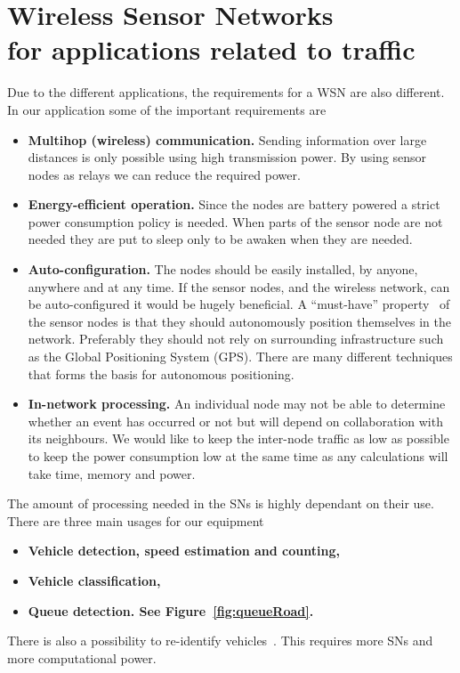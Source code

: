 \section[Wireless Sensor Networks for applications related to traffic]{Wireless Sensor Networks\\for applications related to traffic}
Due to the different applications, the requirements for a WSN are also different. In our application some of the important requirements are
\begin{itemize}
 \item \textbf{Multihop (wireless) communication.} Sending information over large distances is only possible using high transmission power. By using sensor nodes as relays we can reduce the required power.
 
 \item \textbf{Energy-efficient operation.} Since the nodes are battery powered a strict power consumption policy is needed. When parts of the sensor node are not needed they are put to sleep only to be awaken when they are needed.
 
\item \textbf{Auto-configuration.} The nodes should be easily installed, by anyone, anywhere and at any time. If the sensor nodes, and the wireless network, can be auto-configured it would be hugely beneficial. A \mbox{``must-have''} property~\cite{rydstrom2006} of the sensor nodes is that they should autonomously position themselves in the network. Preferably they should not rely on surrounding infrastructure such as the Global Positioning System (GPS). There are many different techniques that forms the basis for autonomous positioning. %

\item \textbf{In-network processing.} An individual node may not be able to determine whether an event has occurred or not but will depend on collaboration with its neighbours. We would like to keep the inter-node traffic as low as possible to keep the power consumption low at the same time as any calculations will take time, memory and power.
\end{itemize}

The amount of processing needed in the SNs is highly dependant on their use. There are three main usages for our equipment
\begin{itemize}
 \item \textbf{Vehicle detection, speed estimation and counting,}
 \item \textbf{Vehicle classification,}
 \item \textbf{Queue detection. See Figure~\ref{fig:queueRoad}.}
\end{itemize}

There is also a possibility to re-identify vehicles~\cite{cheung2005-1}. This requires more SNs and more computational power.